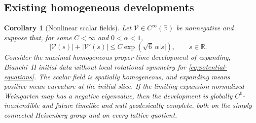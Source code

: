 \documentclass[10pt,a4paper]{article}
\numberwithin{equation}{section}
\newtheorem{corollary}[theorem]{Corollary}
\theoremstyle{definition}
\theoremstyle{remark}
\newcommand{\R}{\mathbb R}
\begin{document}
\subsection{Existing homogeneous developments}

\begin{corollary}[Nonlinear scalar fields]\label{cor:nonlinear-scalar-existing}
Let $\mathcal V\in C^\infty(\R)$ be nonnegative and suppose that, for some
$C<\infty$ and $0<\alpha<1$,
\begin{equation}\label{eq:potential-ringstrom-growth}
 |\mathcal V(s)|+|\mathcal V'(s)|
 \le C\exp(\sqrt6\,\alpha|s|),\qquad s\in\R.
\end{equation}
Consider the maximal homogeneous proper-time development of expanding,
Bianchi~II initial data without local rotational symmetry for
\eqref{eq:potential-equations}.  The scalar field is spatially homogeneous,
and expanding means positive mean curvature at the initial slice.
If the limiting
expansion-normalized Weingarten map has a negative eigenvalue, then the
development is globally $C^0$-inextendible and future timelike and null
geodesically complete, both on the simply connected Heisenberg group
and on every lattice quotient.
\end{corollary}
\end{document}
